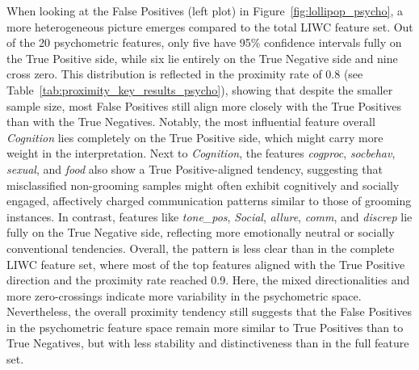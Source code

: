 When looking at the False Positives (left plot) in Figure~\ref{fig:lollipop_psycho}, a more heterogeneous picture emerges compared to the total LIWC feature set. Out of the 20 psychometric features, only five have 95\% confidence intervals fully on the True Positive side, while six lie entirely on the True Negative side and nine cross zero. This distribution is reflected in the proximity rate of 0.8 (see Table~\ref{tab:proximity_key_results_psycho}), showing that despite the smaller sample size, most False Positives still align more closely with the True Positives than with the True Negatives. Notably, the most influential feature overall \textit{Cognition} lies completely on the True Positive side, which might carry more weight in the interpretation. Next to \textit{Cognition}, the features \textit{cogproc}, \textit{socbehav}, \textit{sexual}, and \textit{food} also show a True Positive-aligned tendency, suggesting that misclassified non-grooming samples might often exhibit cognitively and socially engaged, affectively charged communication patterns similar to those of grooming instances. In contrast, features like \textit{tone\_pos}, \textit{Social}, \textit{allure}, \textit{comm}, and \textit{discrep} lie fully on the True Negative side, reflecting more emotionally neutral or socially conventional tendencies. Overall, the pattern is less clear than in the complete LIWC feature set, where most of the top features aligned with the True Positive direction and the proximity rate reached 0.9. Here, the mixed directionalities and more zero-crossings indicate more variability in the psychometric space. Nevertheless, the overall proximity tendency still suggests that the False Positives in the psychometric feature space remain more similar to True Positives than to True Negatives, but with less stability and distinctiveness than in the full feature set.


